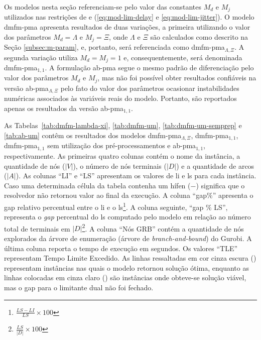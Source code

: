 Os modelos  nesta seção referenciam-se pelo  valor das constantes $M_d$  e $M_j$
utilizados  nas restrições  de  {\delay} e  {\jitter} (\ref{eq:mod-lim-delay}  e
\ref{eq:mod-lim-jitter}). O  modelo \gls{dmfm-pma} apresenta resultados  de duas
variações, a primeira utilizando o valor dos parâmetros $M_d = \Lambda$ e $M_j =
\Xi$,  onde   $\Lambda$  e   $\Xi$  são  calculados   como  descrito   na  Seção
\ref{subsec:m-param},      e,     portanto,      será     referenciada      como
\gls{dmfm-pma}$_{\Lambda, \Xi}$. A  segunda variação utiliza $M_d = M_j  = 1$ e,
consequentemente,   será  denominada   \gls{dmfm-pma}$_{1,  1}$.   A  formulação
\gls{ab-pma} segue  o mesmo  padrão de diferenciação  pelo valor  dos parâmetros
$M_d$  e $M_j$,  mas  não foi  possível obter  resultados  confiáveis na  versão
\gls{ab-pma}$_{\Lambda,  \Xi}$  pelo  fato  do valor  dos  parâmetros  ocasionar
instabilidades numéricas associados às variáveis  reais do modelo. Portanto, são
reportados apenas os resultados da versão \gls{ab-pma}$_{1, 1}$.

As              Tabelas~\ref{tab:dmfm-lambda-xi},             \ref{tab:dmfm-um},
\ref{tab:dmfm-um-semprep}  e \ref{tab:ab-um}  contêm os  resultados dos  modelos
\gls{dmfm-pma}$_{\Lambda,  \Xi}$,  \gls{dmfm-pma}$_{1, 1}$,  \gls{dmfm-pma}$_{1,
1}$   sem   utilização   dos   pré-processamentos   e   \gls{ab-pma}$_{1,   1}$,
respectivamente.  As primeiras  quatro colunas  contém  o nome  da instância,  a
quantidade de nós ($|V|$),  o número de nós terminais ($|D|$)  e a quantidade de
arcos ($|A|$).  As colunas ``LI'' e  ``LS'' apresentam os valores  de \gls{li} e
\gls{ls} para cada instância. Caso uma  determinada célula da tabela contenha um
hífen ($-$) significa que o resolvedor  não retornou valor ao final da execução.
A coluna  ``gap$\%$'' apresenta o gap  relativo percentual entre o  \gls{li} e o
\gls{ls}\footnote{$\frac{LS  - LI}{LS}  \times 100$}.  A coluna  seguinte, ``gap
$\%$ LS'', representa  o {\em gap} percentual do \gls{ls}  computado pelo modelo
em relação ao número total de terminais em $|D|$\footnote{$\frac{LS}{|D|} \times
100$}. A coluna ``Nós  GRB'' contém a quantidade de nós  explorados da árvore de
enumeração (árvore de {\em branch-and-bound}) do Gurobi. A última coluna reporta
o tempo  de execução em  segundos. Os  valores ``TLE'' representam  Tempo Limite
Excedido.  As  linhas ressaltadas  em  cor  cinza escura  (\crule[gr]{3mm}{3mm})
representam instâncias  nas quais o  modelo retornou solução ótima,  enquanto as
linhas  colocadas em  cinza  claro (\crule[lgr]{3mm}{3mm})  são instâncias  onde
obteve-se solução viável, mas o gap para o limitante dual não foi fechado.
\newpage

